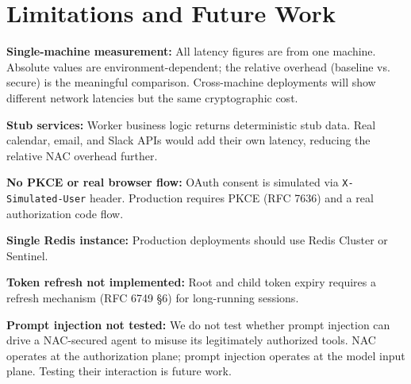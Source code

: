 \documentclass[journal]{IEEEtran}
\begin{document}


\section{Limitations and Future Work}
\label{sec:limitations}

\textbf{Single-machine measurement:} All latency figures are from one machine. Absolute values are environment-dependent; the relative overhead (baseline vs. secure) is the meaningful comparison. Cross-machine deployments will show different network latencies but the same cryptographic cost.

\textbf{Stub services:} Worker business logic returns deterministic stub data. Real calendar, email, and Slack APIs would add their own latency, reducing the relative NAC overhead further.

\textbf{No PKCE or real browser flow:} OAuth consent is simulated via \texttt{X-Simulated-User} header. Production requires PKCE (RFC 7636) and a real authorization code flow.

\textbf{Single Redis instance:} Production deployments should use Redis Cluster or Sentinel.

\textbf{Token refresh not implemented:} Root and child token expiry requires a refresh mechanism (RFC 6749 §6) for long-running sessions.

\textbf{Prompt injection not tested:} We do not test whether prompt injection can drive a NAC-secured agent to misuse its legitimately authorized tools. NAC operates at the authorization plane; prompt injection operates at the model input plane. Testing their interaction is future work.
\end{document}
